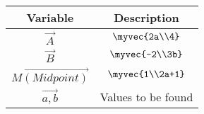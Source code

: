 \begin{tabular}[13pt]{ |c| c|}
    \hline
    \textbf{Variable} & \textbf{Description}\\ 
    \hline
	$\vec{A}$ & $\myvec{2a\\4}$\\
	\hline
	$\vec{B}$ & $\myvec{-2\\3b}$\\
	\hline
	$\vec{M(Midpoint)}$ & $\myvec{1\\2a+1}$\\
	\hline
	$\vec{a,b}$ & Values to be found\\
	\hline
\end{tabular}
